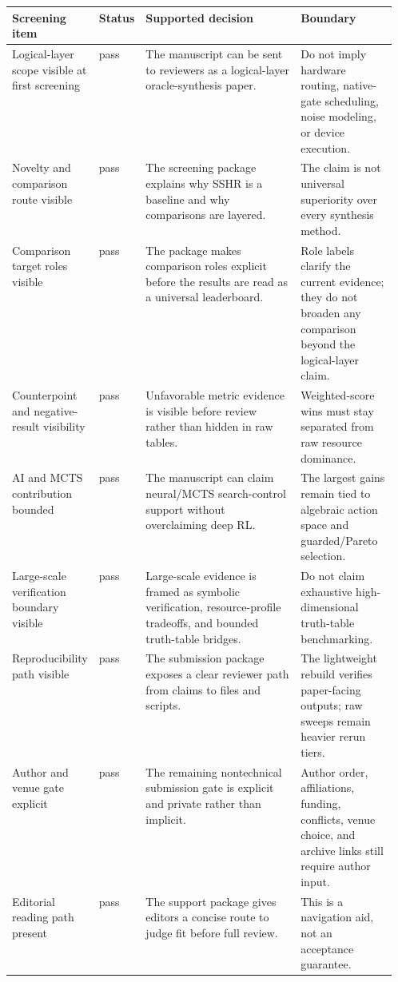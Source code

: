 \begin{tabularx}{\linewidth}{>{\raggedright\arraybackslash}p{0.20\linewidth}>{\raggedright\arraybackslash}p{0.11\linewidth}>{\raggedright\arraybackslash}X>{\raggedright\arraybackslash}p{0.25\linewidth}}
\toprule
Screening item & Status & Supported decision & Boundary \\
\midrule
Logical-layer scope visible at first screening & pass & The manuscript can be sent to reviewers as a logical-layer oracle-synthesis paper. & Do not imply hardware routing, native-gate scheduling, noise modeling, or device execution. \\
Novelty and comparison route visible & pass & The screening package explains why SSHR is a baseline and why comparisons are layered. & The claim is not universal superiority over every synthesis method. \\
Comparison target roles visible & pass & The package makes comparison roles explicit before the results are read as a universal leaderboard. & Role labels clarify the current evidence; they do not broaden any comparison beyond the logical-layer claim. \\
Counterpoint and negative-result visibility & pass & Unfavorable metric evidence is visible before review rather than hidden in raw tables. & Weighted-score wins must stay separated from raw resource dominance. \\
AI and MCTS contribution bounded & pass & The manuscript can claim neural/MCTS search-control support without overclaiming deep RL. & The largest gains remain tied to algebraic action space and guarded/Pareto selection. \\
Large-scale verification boundary visible & pass & Large-scale evidence is framed as symbolic verification, resource-profile tradeoffs, and bounded truth-table bridges. & Do not claim exhaustive high-dimensional truth-table benchmarking. \\
Reproducibility path visible & pass & The submission package exposes a clear reviewer path from claims to files and scripts. & The lightweight rebuild verifies paper-facing outputs; raw sweeps remain heavier rerun tiers. \\
Author and venue gate explicit & pass & The remaining nontechnical submission gate is explicit and private rather than implicit. & Author order, affiliations, funding, conflicts, venue choice, and archive links still require author input. \\
Editorial reading path present & pass & The support package gives editors a concise route to judge fit before full review. & This is a navigation aid, not an acceptance guarantee. \\
\bottomrule
\end{tabularx}
